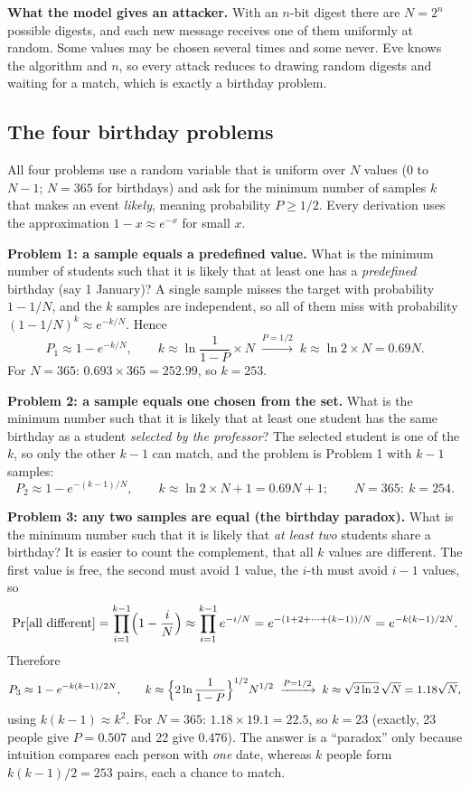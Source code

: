 \textbf{What the model gives an attacker.} With an $n$-bit digest there are $N = 2^n$ possible digests, and each new message receives one of them uniformly at random. Some values may be chosen several times and some never. Eve knows the algorithm and $n$, so every attack reduces to drawing random digests and waiting for a match, which is exactly a birthday problem.

\subsection{The four birthday problems \new}

All four problems use a random variable that is uniform over $N$ values ($0$ to $N - 1$; $N = 365$ for birthdays) and ask for the minimum number of samples $k$ that makes an event \emph{likely}, meaning probability $P \ge 1/2$. Every derivation uses the approximation $1 - x \approx e^{-x}$ for small $x$.

\textbf{Problem 1: a sample equals a predefined value.} What is the minimum number of students such that it is likely that at least one has a \emph{predefined} birthday (say 1 January)? A single sample misses the target with probability $1 - 1/N$, and the $k$ samples are independent, so all of them miss with probability $(1 - 1/N)^k \approx e^{-k/N}$. Hence
\[
P_1 \approx 1 - e^{-k/N}, \qquad k \approx \ln\frac{1}{1-P}\times N \;\xrightarrow{P = 1/2}\; k \approx \ln 2 \times N = 0.69N .
\]
For $N = 365$: $0.693 \times 365 = 252.99$, so $k = 253$.

\textbf{Problem 2: a sample equals one chosen from the set.} What is the minimum number such that it is likely that at least one student has the same birthday as a student \emph{selected by the professor}? The selected student is one of the $k$, so only the other $k - 1$ can match, and the problem is Problem 1 with $k - 1$ samples:
\[
P_2 \approx 1 - e^{-(k-1)/N}, \qquad k \approx \ln 2 \times N + 1 = 0.69N + 1 ;\qquad N = 365:\ k = 254 .
\]

\textbf{Problem 3: any two samples are equal (the birthday paradox).} What is the minimum number such that it is likely that \emph{at least two} students share a birthday? It is easier to count the complement, that all $k$ values are different. The first value is free, the second must avoid 1 value, the $i$-th must avoid $i - 1$ values, so
\[
\Pr[\text{all different}] = \prod_{i=1}^{k-1}\Bigl(1 - \frac{i}{N}\Bigr) \approx \prod_{i=1}^{k-1} e^{-i/N} = e^{-(1 + 2 + \dots + (k-1))/N} = e^{-k(k-1)/2N}.
\]
Therefore
\[
P_3 \approx 1 - e^{-k(k-1)/2N}, \qquad k \approx \Bigl\{2\ln\frac{1}{1-P}\Bigr\}^{1/2} N^{1/2} \;\xrightarrow{P = 1/2}\; k \approx \sqrt{2\ln 2}\,\sqrt N = 1.18\sqrt N ,
\]
using $k(k-1) \approx k^2$. For $N = 365$: $1.18 \times 19.1 = 22.5$, so $k = 23$ (exactly, 23 people give $P = 0.507$ and 22 give $0.476$). The answer is a ``paradox'' only because intuition compares each person with \emph{one} date, whereas $k$ people form $k(k-1)/2 = 253$ pairs, each a chance to match.

